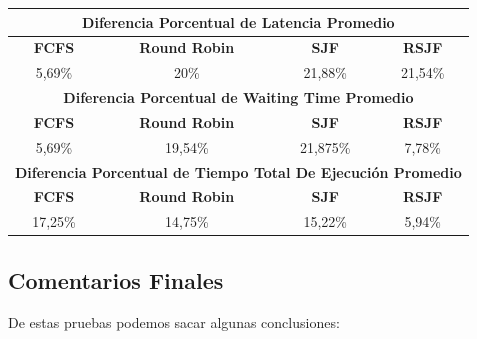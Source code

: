 \begin{center}
	\begin{tabular}{|c|c|c|c|}
		\hline
		\multicolumn{4}{|c|}{\large{\textbf{Diferencia Porcentual de Latencia Promedio}}} \\
		\hline
		\textbf{FCFS} & \textbf{Round Robin} & \textbf{SJF} & \textbf{RSJF} \\
		\hline
		5,69\% & 20\% & 21,88\% & 21,54\% \\
		\hline
		\multicolumn{4}{|c|}{\large{\textbf{Diferencia Porcentual de Waiting Time Promedio}}} \\
		\hline
		\textbf{FCFS} & \textbf{Round Robin} & \textbf{SJF} & \textbf{RSJF} \\
		\hline
		5,69\% &	 19,54\% & 21,875\% & 7,78\% \\
		\hline
		\multicolumn{4}{|c|}{\large{\textbf{Diferencia Porcentual de Tiempo Total De Ejecución Promedio}}} \\
		\hline
		\textbf{FCFS} & \textbf{Round Robin} & \textbf{SJF} & \textbf{RSJF} \\
		\hline
		17,25\% & 14,75\% &	15,22\% & 5,94\% \\
		\hline
	\end{tabular}
\end{center}

\subsection{Comentarios Finales}

De estas pruebas podemos sacar algunas conclusiones:

